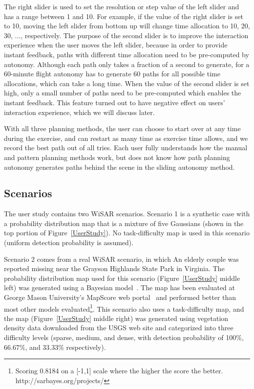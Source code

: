 \documentclass[journal]{IEEEtran}
\begin{document}
The right slider is used to set the resolution or step value of the left slider and has a range between 1 and 10. For example, if the value of the right slider is set to 10, moving the left slider from bottom up will change time allocation to 10, 20, 30, ..., respectively. The purpose of the second slider is to improve the interaction experience when the user moves the left slider, because in order to provide instant feedback, paths with different time allocation need to be pre-computed by autonomy. Although each path only takes a fraction of a second to generate, for a 60-minute flight autonomy has to generate 60 paths for all possible time allocations, which can take a long time. When the value of the second slider is set high, only a small number of paths need to be pre-computed which enables the instant feedback. This feature turned out to have negative effect on users' interaction experience, which we will discuss later.

With all three planning methods, the user can choose to start over at any time during the exercise, and can restart as many time as exercise time allows, and we record the best path out of all tries. Each user fully understands how the manual and pattern planning methods work, but does not know how path planning autonomy generates paths behind the scene in the sliding autonomy method.

\subsection{Scenarios}

The user study contains two WiSAR scenarios. Scenario 1 is a synthetic case with a probability distribution map that is a mixture of five Gaussians (shown in the top portion of Figure~\ref{UserStudy}). No task-difficulty map is used in this scenario (uniform detection probability is assumed). 

Scenario 2 comes from a real WiSAR scenario, in which An elderly couple was reported missing near the Grayson Highlands State Park in Virginia. The probability distribution map used for this scenario (Figure~\ref{UserStudy} middle left) was generated using a Bayesian model~\cite{Lin2010Bayesian}. The map has been evaluated at George Mason University's MapScore web portal~\cite{Twardy2012MapScore} and performed better than most other models evaluated\footnote{Scoring 0.8184 on a [-1,1] scale where the higher the score the better. http://sarbayes.org/projects/}. This scenario also uses a task-difficulty map, and the map (Figure~\ref{UserStudy} middle right) was generated using vegetation density data downloaded from the USGS web site and categorized into three difficulty levels (sparse, medium, and dense, with detection probability of 100\%, 66.67\%, and 33.33\% respectively).
\end{document}
